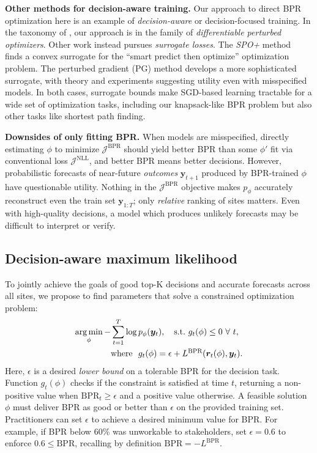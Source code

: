 \textbf{Other methods for decision-aware training.}
Our approach to direct BPR optimization here is an example of \emph{decision-aware} or decision-focused training.
In the taxonomy of \citet{mandi_decision-focused_2024}, our approach is in the family of \emph{differentiable perturbed optimizers}. 
Other work instead pursues \emph{surrogate losses}. 
The \emph{SPO+} method~\citep{elmachtoubSmartPredictThen2022} finds a convex surrogate for the ``smart predict then optimize'' optimization problem. 
The perturbed gradient (PG) method \cite{huang_decision-focused_2024} develops a more sophisticated surrogate, with theory and experiments suggesting utility even with misspecified models.
In both cases, surrogate bounds make SGD-based learning tractable for a wide set of optimization tasks, including our knapsack-like BPR problem but also other tasks like shortest path finding.



\textbf{Downsides of only fitting BPR.}
When models are misspecified, directly estimating $\phi$ to minimize $\mathcal{J}^{\text{BPR}}$ should yield better BPR than some $\phi'$ fit via conventional loss $\mathcal{J}^{\text{NLL}}$, and better BPR means better decisions. 
 However, probabilistic forecasts of near-future \emph{outcomes} $\bm{y}_{t+1}$ produced by BPR-trained $\phi$ have questionable utility.
 Nothing in the $\mathcal{J}^{\text{BPR}}$ objective makes $p_{\phi}$ accurately reconstruct even the train set $\bm{y}_{1:T}$; only \emph{relative} ranking of sites matters. Even with high-quality decisions, a model which produces unlikely forecasts may be difficult to interpret or verify.

\subsection{Decision-aware maximum likelihood}

To jointly achieve the goals of good top-K decisions and accurate forecasts across all sites, we propose to find parameters that solve a constrained optimization problem:
\begin{align}
    \operatorname*{arg\,min}_{\phi} - \textstyle & \sum_{t=1}^T \log p_{\phi}(\bm{y}_t),
    \quad 
    \text{s.t.}~ g_t(\phi) \leq 0 ~\forall~ t,
    \\ \notag
    & \text{where}~~
    \textstyle
    g_t(\phi) = \epsilon + L^{\text{BPR}}( \bm{r}_t(\phi),  \bm{y}_t ).
\end{align}
Here, $\epsilon$ is a desired \emph{lower bound} on a tolerable BPR for the decision task. Function $g_t(\phi)$ checks if the constraint is satisfied at time $t$, returning a non-positive value when $\text{BPR}_t \geq \epsilon$ and a positive value otherwise.
A feasible solution $\phi$ must deliver BPR as good or better than $\epsilon$ on the provided training set. Practitioners can set $\epsilon$ to achieve a desired minimum value for BPR. For example, 
if BPR below 60\% was unworkable to stakeholders, set $\epsilon = 0.6$ to
 enforce $0.6 \leq \text{BPR}$, recalling by definition $\text{BPR} = -L^{\text{BPR}}$.

